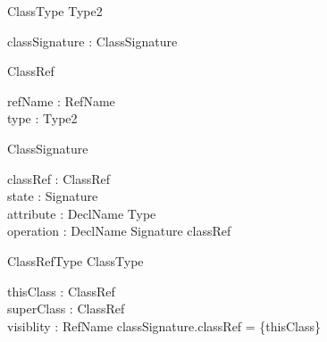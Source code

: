 \begin{sidebyside}
\begin{class}{ClassType}
  Type2\\
\begin{state}
  classSignature : ClassSignature
\end{state}
\end{class}
\nextside
\begin{class}{ClassRef}
\begin{state}
  refName : RefName\\
  type : \seq Type2
\end{state}
\end{class}
\end{sidebyside}
\begin{sidebyside}
\begin{class}{ClassSignature}
\begin{state}
  classRef : \finset ClassRef\\
  state : Signature\\
  attribute : DeclName \pfun Type\\
  operation : DeclName \pfun Signature
\where
  classRef \neq \emptyset
\end{state}
\end{class}
\nextside
\begin{class}{ClassRefType}
  ClassType\\
\begin{state}
  thisClass : ClassRef\\
  superClass : \finset ClassRef\\
  visiblity : \finset RefName
\where
  classSignature.classRef = \{thisClass\}
\end{state}  
\end{class}
\end{sidebyside}

